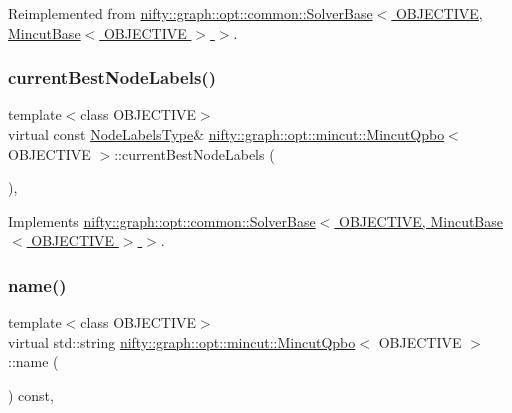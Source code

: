 Reimplemented from \hyperlink{classnifty_1_1graph_1_1opt_1_1common_1_1SolverBase_a871de6574e6189a0c97c0b2121b07155}{nifty\+::graph\+::opt\+::common\+::\+Solver\+Base$<$ O\+B\+J\+E\+C\+T\+I\+V\+E, Mincut\+Base$<$ O\+B\+J\+E\+C\+T\+I\+V\+E $>$ $>$}.

\mbox{\label{classnifty_1_1graph_1_1opt_1_1mincut_1_1MincutQpbo_a8cec66d517bc70ed0065b60174d01ce4}} 
\subsubsection{\texorpdfstring{current\+Best\+Node\+Labels()}{currentBestNodeLabels()}}
{\footnotesize\ttfamily template$<$class O\+B\+J\+E\+C\+T\+I\+VE$>$ \\
virtual const \hyperlink{classnifty_1_1graph_1_1opt_1_1mincut_1_1MincutQpbo_ac4034e26807b6dd2ec740c8716f89ad8}{Node\+Labels\+Type}\& \hyperlink{classnifty_1_1graph_1_1opt_1_1mincut_1_1MincutQpbo}{nifty\+::graph\+::opt\+::mincut\+::\+Mincut\+Qpbo}$<$ O\+B\+J\+E\+C\+T\+I\+VE $>$\+::current\+Best\+Node\+Labels (\begin{DoxyParamCaption}{ }\end{DoxyParamCaption})\hspace{0.3cm}{\ttfamily [inline]}, {\ttfamily [virtual]}}



Implements \hyperlink{classnifty_1_1graph_1_1opt_1_1common_1_1SolverBase_a7bbe01ee201cf3157b251e54c5ff0619}{nifty\+::graph\+::opt\+::common\+::\+Solver\+Base$<$ O\+B\+J\+E\+C\+T\+I\+V\+E, Mincut\+Base$<$ O\+B\+J\+E\+C\+T\+I\+V\+E $>$ $>$}.

\mbox{\label{classnifty_1_1graph_1_1opt_1_1mincut_1_1MincutQpbo_a4bcea4c5573610d9b656a06772d97353}} 
\subsubsection{\texorpdfstring{name()}{name()}}
{\footnotesize\ttfamily template$<$class O\+B\+J\+E\+C\+T\+I\+VE$>$ \\
virtual std\+::string \hyperlink{classnifty_1_1graph_1_1opt_1_1mincut_1_1MincutQpbo}{nifty\+::graph\+::opt\+::mincut\+::\+Mincut\+Qpbo}$<$ O\+B\+J\+E\+C\+T\+I\+VE $>$\+::name (\begin{DoxyParamCaption}{ }\end{DoxyParamCaption}) const\hspace{0.3cm}{\ttfamily [inline]}, {\ttfamily [virtual]}}



